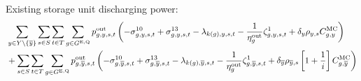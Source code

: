 \documentclass{article}
\begin{document}
Existing storage unit discharging power:
\begin{align}
	& \sum\limits_{\iYear \in \sYears \setminus \{\iYearTerminal\}}\sum\limits_{\iScenario \in \sScenarios}\sum\limits_{\iInterval \in \sIntervals 
	} \sum\limits_{\iGenerator \in \sStorageExisting} \vPowerOut \left( - \dNonNegativeDischarging + \dMaxDischargingRateExisting - \dPowerBalance[k(\iGenerator),\iYear,\iScenario,\iInterval] - \frac{1}{\cStorageUnitEfficiencyDischarging} \dStorageEnergyTransition + \cDiscountRate \cScenarioDuration \cMarginalCost \right) \nonumber\\
	& + \sum\limits_{\iScenario \in \sScenarios}\sum\limits_{\iInterval \in \sIntervals 
} \sum\limits_{\iGenerator \in \sStorageExisting} \vPowerOut[\iGenerator,\iYearTerminal,\iScenario,\iInterval] \left( - \dNonNegativeDischarging[\iGenerator,\iYearTerminal,\iScenario,\iInterval] + \dMaxDischargingRateExisting[\iGenerator,\iYearTerminal,\iScenario,\iInterval] - \dPowerBalance[k(\iGenerator),\iYearTerminal,\iScenario,\iInterval] - \frac{1}{\cStorageUnitEfficiencyDischarging} \dStorageEnergyTransition[\iGenerator,\iYearTerminal,\iScenario,\iInterval] + \cDiscountRate[\iYearTerminal] \cScenarioDuration[\iYearTerminal,\iScenario] \left[1 + \frac{1}{\cInterestRate}\right] \cMarginalCost[\iGenerator,\iYearTerminal] \right) \nonumber\\
\end{align}
\end{document}
